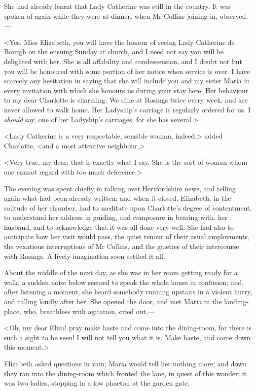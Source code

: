 She had already learnt that Lady Catherine was still in the country. It was spoken of again while they were at dinner, when Mr Collins joining in, observed,—

<Yes, Miss Elizabeth, you will have the honour of seeing Lady Catherine de Bourgh on the ensuing Sunday at church, and I need not say you will be delighted with her. She is all affability and condescension, and I doubt not but you will be honoured with some portion of her notice when service is over. I have scarcely any hesitation in saying that she will include you and my sister Maria in every invitation with which she honours us during your stay here. Her behaviour to my dear Charlotte is charming. We dine at Rosings twice every week, and are never allowed to walk home. Her Ladyship's carriage is regularly ordered for us. I \textit{should} say, one of her Ladyship's carriages, for she has several.>

<Lady Catherine is a very respectable, sensible woman, indeed,> added Charlotte, <and a most attentive neighbour.>

<Very true, my dear, that is exactly what I say. She is the sort of woman whom one cannot regard with too much deference.>

The evening was spent chiefly in talking over Hertfordshire news, and telling again what had been already written; and when it closed, Elizabeth, in the solitude of her chamber, had to meditate upon Charlotte's degree of contentment, to understand her address in guiding, and composure in bearing with, her husband, and to acknowledge that it was all done very well. She had also to anticipate how her visit would pass, the quiet tenour of their usual employments, the vexatious interruptions of Mr Collins, and the gaieties of their intercourse with Rosings. A lively imagination soon settled it all.

About the middle of the next day, as she was in her room getting ready for a walk, a sudden noise below seemed to speak the whole house in confusion; and, after listening a moment, she heard somebody running upstairs in a violent hurry, and calling loudly after her. She opened the door, and met Maria in the landing-place, who, breathless with agitation, cried out,—

<Oh, my dear Eliza! pray make haste and come into the dining-room, for there is such a sight to be seen! I will not tell you what it is. Make haste, and come down this moment.>

Elizabeth asked questions in vain; Maria would tell her nothing more; and down they ran into the dining-room which fronted the lane, in quest of this wonder; it was two ladies, stopping in a low phaeton at the garden gate.

